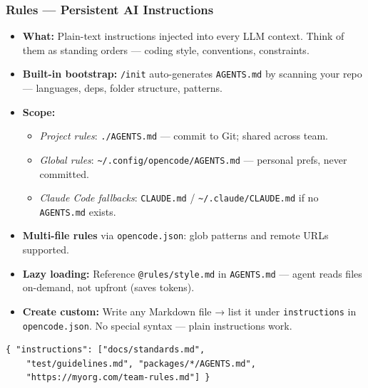 \begin{frame}[fragile]\frametitle{Rules — Persistent AI Instructions}
  \begin{itemize}
    \item \textbf{What:} Plain-text instructions injected into every LLM context. Think of them as standing orders — coding style, conventions, constraints.
    \item \textbf{Built-in bootstrap:} \texttt{/init} auto-generates \texttt{AGENTS.md} by scanning your repo — languages, deps, folder structure, patterns.
    \item \textbf{Scope:}
      \begin{itemize}
        \item \textit{Project rules}: \texttt{./AGENTS.md} — commit to Git; shared across team.
        \item \textit{Global rules}: \texttt{\textasciitilde/.config/opencode/AGENTS.md} — personal prefs, never committed.
        \item \textit{Claude Code fallbacks}: \texttt{CLAUDE.md} / \texttt{\textasciitilde/.claude/CLAUDE.md} if no \texttt{AGENTS.md} exists.
      \end{itemize}
    \item \textbf{Multi-file rules} via \texttt{opencode.json}: glob patterns and remote URLs supported.

    \item \textbf{Lazy loading:} Reference \texttt{@rules/style.md} in \texttt{AGENTS.md} — agent reads files on-demand, not upfront (saves tokens).
    \item \textbf{Create custom:} Write any Markdown file → list it under \texttt{instructions} in \texttt{opencode.json}. No special syntax — plain instructions work.
  \end{itemize}
  
\begin{lstlisting}
{ "instructions": ["docs/standards.md",
    "test/guidelines.md", "packages/*/AGENTS.md",
    "https://myorg.com/team-rules.md"] }
\end{lstlisting}  
\end{frame}

